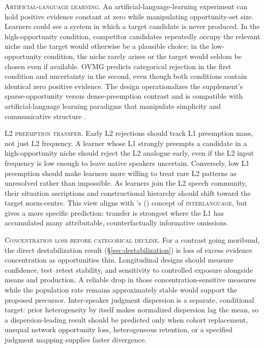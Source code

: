\documentclass[12pt,letterpaper]{article}
\newcommand{\term}[1]{\textsc{#1}}
\newcommand{\posscite}[1]{\citeauthor{#1}'s (\citeyear{#1})}
\begin{document}
\noindent\textsc{Artificial-language learning.} An artificial-language-learning experiment can hold positive evidence constant
at zero while manipulating opportunity-set size. Learners could see a system in
which a target candidate is never produced. In the high-opportunity condition,
competitor candidates repeatedly occupy the relevant niche and the target would
otherwise be a plausible choice; in the low-opportunity condition, the niche
rarely arises or the target would seldom be chosen even if available. OVMG predicts categorical
rejection in the first condition and uncertainty in the second, even though both
conditions contain identical zero positive evidence. The design operationalizes
the supplement's sparse-opportunity versus dense-preemption contrast and is compatible with artificial-language
learning paradigms that manipulate simplicity and communicative structure
\autocite{culbertson2016simplicity}.

\noindent\textsc{L2 preemption transfer.} Early L2 rejections should track L1 preemption mass, not just L2 frequency. A
learner whose L1 strongly preempts a candidate in a high-opportunity niche
should reject the L2 analogue early, even if the L2 input frequency is low enough
to leave native speakers uncertain. Conversely, low L1 preemption should make
learners more willing to treat rare L2 patterns as unresolved rather than
impossible. As learners join the L2 speech community, their situation
ascriptions and constructional hierarchy should shift toward the target
norm-centre. This view
aligns with \posscite{selinker1972} concept of \term{interlanguage}, but gives a
more specific prediction: transfer is strongest where the L1 has accumulated
many attributable, counterfactually informative omissions.

\noindent\textsc{Concentration loss before categorical decline.} For a contrast
going moribund, the direct destabilization result
(\S\ref{sec:destabilization}) is loss of excess evidence concentration as
opportunities thin. Longitudinal designs should measure confidence,
test--retest stability, and sensitivity to controlled exposure alongside means
and production. A reliable drop in those concentration-sensitive measures while
the population rate remains approximately stable would support the proposed
precursor. Inter-speaker judgment dispersion is a separate, conditional target:
prior heterogeneity by itself makes normalized dispersion lag the mean, so a
dispersion-leading result should be predicted only when cohort replacement,
unequal network opportunity loss, heterogeneous retention, or a specified
judgment mapping supplies faster divergence.
\end{document}
